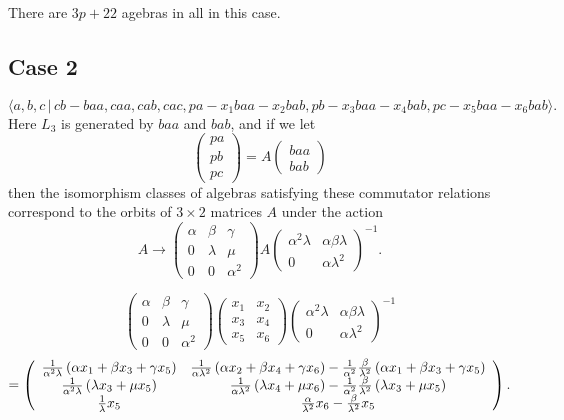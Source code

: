 \documentclass[10pt,thmsa]{article}
\begin{document}
There are $3p+22$ agebras in all in this case.

\subsection{Case 2}

\[
\langle
a,b,c\,|%
\,cb-baa,caa,cab,cac,pa-x_{1}baa-x_{2}bab,pb-x_{3}baa-x_{4}bab,pc-x_{5}baa-x_{6}bab\rangle . 
\]%
Here $L_{3}$ is generated by $baa$ and $bab$, and if we let 
\[
\left( 
\begin{array}{l}
pa \\ 
pb \\ 
pc%
\end{array}%
\right) =A\left( 
\begin{array}{l}
baa \\ 
bab%
\end{array}%
\right) 
\]%
then the isomorphism classes of algebras satisfying these commutator
relations correspond to the orbits of $3\times 2$ matrices $A$ under the
action 
\[
A\rightarrow \left( 
\begin{array}{lll}
\alpha & \beta & \gamma \\ 
0 & \lambda & \mu \\ 
0 & 0 & \alpha ^{2}%
\end{array}%
\right) A\left( 
\begin{array}{ll}
\alpha ^{2}\lambda & \alpha \beta \lambda \\ 
0 & \alpha \lambda ^{2}%
\end{array}%
\right) ^{-1}. 
\]

\[
\left( 
\begin{array}{lll}
\alpha & \beta & \gamma \\ 
0 & \lambda & \mu \\ 
0 & 0 & \alpha ^{2}%
\end{array}%
\right) \left( 
\begin{array}{cc}
x_{1} & x_{2} \\ 
x_{3} & x_{4} \\ 
x_{5} & x_{6}%
\end{array}%
\right) \left( 
\begin{array}{ll}
\alpha ^{2}\lambda & \alpha \beta \lambda \\ 
0 & \alpha \lambda ^{2}%
\end{array}%
\right) ^{-1} 
\]
\[
=\left( 
\begin{array}{cc}
\frac{1}{\alpha ^{2}\lambda }\left( \alpha x_{1}+\beta x_{3}+\gamma
x_{5}\right) & \frac{1}{\alpha \lambda ^{2}}\left( \alpha x_{2}+\beta
x_{4}+\gamma x_{6}\right) -\frac{1}{\alpha ^{2}}\frac{\beta }{\lambda ^{2}}%
\left( \alpha x_{1}+\beta x_{3}+\gamma x_{5}\right) \\ 
\frac{1}{\alpha ^{2}\lambda }\left( \lambda x_{3}+\mu x_{5}\right) & \frac{1%
}{\alpha \lambda ^{2}}\left( \lambda x_{4}+\mu x_{6}\right) -\frac{1}{\alpha
^{2}}\frac{\beta }{\lambda ^{2}}\left( \lambda x_{3}+\mu x_{5}\right) \\ 
\frac{1}{\lambda }x_{5} & \frac{\alpha }{\lambda ^{2}}x_{6}-\frac{\beta }{%
\lambda ^{2}}x_{5}%
\end{array}%
\right) \allowbreak . 
\]
\end{document}
